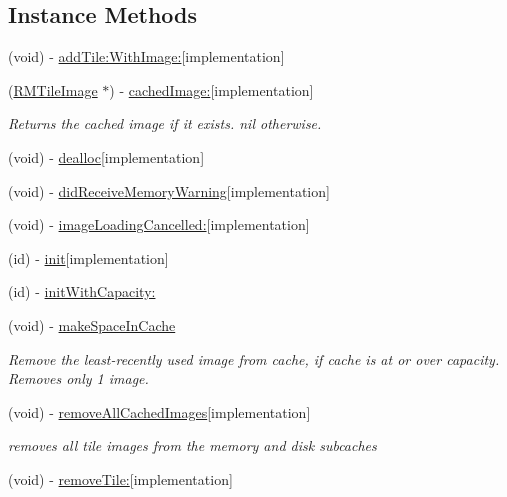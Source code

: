 \subsection*{Instance Methods}
\begin{DoxyCompactItemize}
\item 
(void) -\/ \hyperlink{interface_r_m_memory_cache_a2f5b236d0de0767e8432014c46c9d7aa}{add\-Tile\-:\-With\-Image\-:}{\ttfamily  \mbox{[}implementation\mbox{]}}
\item 
(\hyperlink{interface_r_m_tile_image}{R\-M\-Tile\-Image} $\ast$) -\/ \hyperlink{interface_r_m_memory_cache_a701b5798480a1a5b7b17d16a0e919218}{cached\-Image\-:}{\ttfamily  \mbox{[}implementation\mbox{]}}
\begin{DoxyCompactList}\small\item\em Returns the cached image if it exists. nil otherwise. \end{DoxyCompactList}\item 
(void) -\/ \hyperlink{interface_r_m_memory_cache_a24a0d4acc108972b519a384e5ed17239}{dealloc}{\ttfamily  \mbox{[}implementation\mbox{]}}
\item 
(void) -\/ \hyperlink{interface_r_m_memory_cache_a39f0e5649c17432eb1369a7157ec0976}{did\-Receive\-Memory\-Warning}{\ttfamily  \mbox{[}implementation\mbox{]}}
\item 
(void) -\/ \hyperlink{interface_r_m_memory_cache_a40834ecc9d8c29ecdbb193d52e1cd7cf}{image\-Loading\-Cancelled\-:}{\ttfamily  \mbox{[}implementation\mbox{]}}
\item 
(id) -\/ \hyperlink{interface_r_m_memory_cache_ad00544180919205d1de0f053620b13de}{init}{\ttfamily  \mbox{[}implementation\mbox{]}}
\item 
(id) -\/ \hyperlink{interface_r_m_memory_cache_a4dfa721402ac7e524be00528ec0cee57}{init\-With\-Capacity\-:}
\item 
(void) -\/ \hyperlink{interface_r_m_memory_cache_a8398cac64d69583ba684081cbbdabf9c}{make\-Space\-In\-Cache}
\begin{DoxyCompactList}\small\item\em Remove the least-\/recently used image from cache, if cache is at or over capacity. Removes only 1 image. \end{DoxyCompactList}\item 
(void) -\/ \hyperlink{interface_r_m_memory_cache_ab46c85497105416077a467aaa917afce}{remove\-All\-Cached\-Images}{\ttfamily  \mbox{[}implementation\mbox{]}}
\begin{DoxyCompactList}\small\item\em removes all tile images from the memory and disk subcaches \end{DoxyCompactList}\item 
(void) -\/ \hyperlink{interface_r_m_memory_cache_ac859b7f94dd2c8af9f1ef1c77271a171}{remove\-Tile\-:}{\ttfamily  \mbox{[}implementation\mbox{]}}
\end{DoxyCompactItemize}
